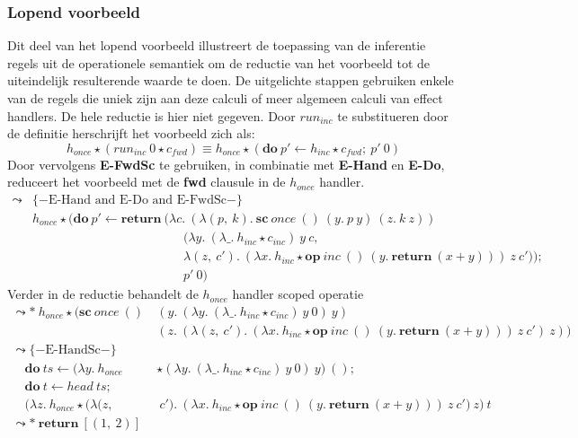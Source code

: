 \subsubsection{Lopend voorbeeld}
Dit deel van het lopend voorbeeld illustreert de toepassing van de inferentie regels uit de operationele semantiek om de reductie van het voorbeeld tot de uiteindelijk resulterende waarde te doen. De uitgelichte stappen gebruiken enkele van de regels die uniek zijn aan deze calculi of meer algemeen calculi van effect handlers. De hele reductie is hier niet gegeven.\newline
Door $run_{inc}$ te substitueren door de definitie herschrijft het voorbeeld zich als:
\begin{equation} 
    h_{once} \star (run_{inc}\:0 \star c_{fwd}) \equiv h_{once} \star (\textbf{do}\:p' \leftarrow h_{inc} \star c_{fwd};\: p'\:0)
\end{equation}
Door vervolgens \textbf{E-FwdSc} te gebruiken, in combinatie met \textbf{E-Hand} en \textbf{E-Do}, reduceert het voorbeeld met de \textbf{fwd} clausule in de \emph{$h_{once}$} handler.
\begin{equation}
    \begin{split}
        \leadsto & \{-\text{E-Hand and E-Do and E-FwdSc}-\} \\
        & h_{once} \star (\textbf{do}\:p' \leftarrow \textbf{return}\:(\lambda c.\:(\lambda (p,\:k).\: \textbf{sc}\:once\:()\:(y.\:p\:y)\:(z.\:k\:z)) \\
        &  \qquad \qquad \qquad \qquad \qquad \qquad (\lambda y. \: (\lambda \_ .\: h_{inc} \star c_{inc})\:y\:c, \\
        & \qquad \qquad \qquad \qquad \qquad \qquad \lambda (z,\:c').\:(\lambda x.\: h_{inc} \star \textbf{op}\:inc\:()\:(y.\:\textbf{return}\:(x+y)))\:z\:c')); \\
        & \qquad \qquad \qquad \qquad \qquad \qquad p'\:0)
    \end{split}
\end{equation}
Verder in de reductie behandelt de $h_{once}$ handler scoped operatie
\begin{equation}
    \begin{split}
        \leadsto* \: h_{once} \star (\textbf{sc}\:once\:()\: & (y.\:(\lambda y.\:(\lambda \_.\:h_{inc} \star c_{inc})\:y\:0)\:y) \\
        & (z.\:(\lambda (z,\:c').\:(\lambda x.\:h_{inc} \star \textbf{op}\:inc\:()\:(y.\:\textbf{return}\:(x+y)))\:z\:c')\:z)) \\
        \leadsto \{- \text{E-HandSc} -\} & \\
        \quad \textbf{do}\:ts \leftarrow (\lambda y.\: h_{once} & \star (\lambda y.\: (\lambda \_.\:h_{inc} \star c_{inc})\:y\:0)\:y)\:(); \\
        \quad \textbf{do}\:t \leftarrow head\:ts; & \\
        \quad (\lambda z.\:h_{once} \star ( \lambda (z, & \:c'). \:(\lambda x.\:h_{inc} \star \textbf{op}\:inc\:()\:(y.\:\textbf{return}\:(x+y)))\:z\:c')\:z)\:t \\
        \leadsto* \: \textbf{return}\:[(1,\:2)]
    \end{split}
\end{equation}


